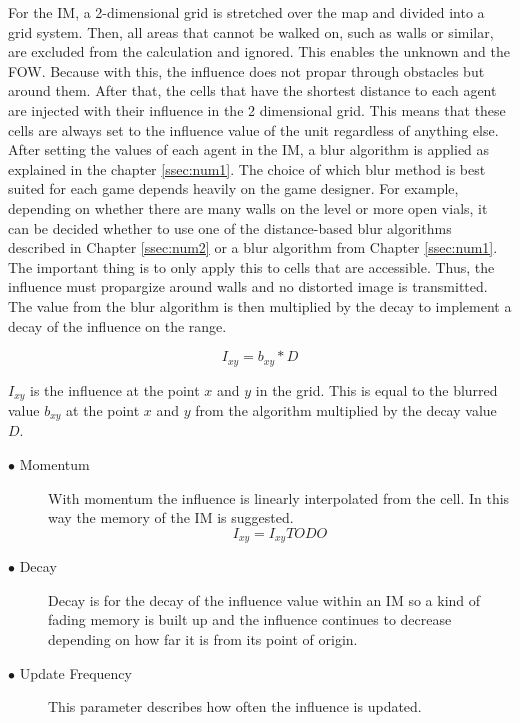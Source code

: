 \documentclass[]{report}
\begin{document}
	For the \ac{IM}, a 2-dimensional grid is stretched over the map and divided into a grid system. Then, all areas that cannot be walked on, such as walls or similar, are excluded from the calculation and ignored. This enables the unknown and the FOW. Because with this, the influence does not propar through obstacles but around them. After that, the cells that have the shortest distance to each agent are injected with their influence in the 2 dimensional grid. This means that these cells are always set to the influence value of the unit regardless of anything else. After setting the values of each agent in the IM, a blur algorithm is applied as explained in the chapter \ref{ssec:num1}. The choice of which blur method is best suited for each game depends heavily on the game designer. For example, depending on whether there are many walls on the level or more open vials, it can be decided whether to use one of the distance-based blur algorithms described in Chapter \ref{ssec:num2} or a blur algorithm from Chapter \ref{ssec:num1}. The important thing is to only apply this to cells that are accessible. Thus, the influence must propargize around walls and no distorted image is transmitted. The value from the blur algorithm is then multiplied by the decay to implement a decay of the influence on the range. 
	
	\begin{equation}
		I_{xy} = b_{xy} * D
	\end{equation}
	
	$I_{xy}$ is the influence at the point $x$ and $y$ in the grid. This is equal to the blurred value $b_{xy}$ at the point $x$ and $y$ from the algorithm multiplied by the decay value $D$.
	
	
	\begin{description}
		\item[$\bullet$ Momentum] With momentum the influence is linearly interpolated from the cell. In this way the memory of the IM is suggested.
		\begin{equation}
			I_{xy} = I_{xy} TODO
		\end{equation}
		\item[$\bullet$ Decay] Decay is for the decay of the influence value within an \ac{IM} so a kind of fading memory is built up and the influence continues to decrease depending on how far it is from its point of origin.
		\item[$\bullet$ Update Frequency] This parameter describes how often the influence is updated. 
		\end {description}
		
\end{document}
